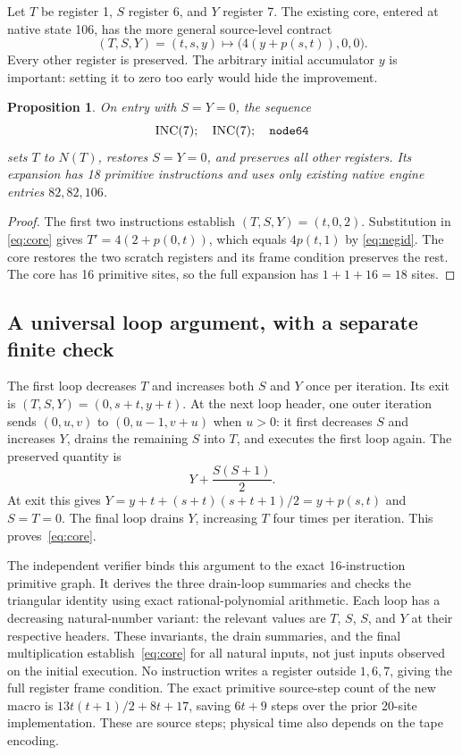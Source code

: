 \documentclass[11pt,a4paper]{article}
\newcommand{\code}[1]{\texttt{\detokenize{#1}}}
\newtheorem{proposition}{Proposition}
\begin{document}
Let $T$ be register 1, $S$ register 6, and $Y$ register 7. The existing
\code{node64} core, entered at native state 106, has the more general
source-level contract
\begin{equation}\label{eq:core}
 (T,S,Y)=(t,s,y)
 \longmapsto
 \bigl(4(y+p(s,t)),0,0\bigr).
\end{equation}
Every other register is preserved. The arbitrary initial accumulator
$y$ is important: setting it to zero too early would hide the improvement.

\begin{proposition}
On entry with $S=Y=0$, the sequence
\[
 \operatorname{INC}(7);\quad\operatorname{INC}(7);\quad\code{node64}
\]
sets $T$ to $N(T)$, restores $S=Y=0$, and preserves all other registers.
Its expansion has 18 primitive instructions and uses only existing native
engine entries $82,82,106$.
\end{proposition}
\begin{proof}
The first two instructions establish $(T,S,Y)=(t,0,2)$. Substitution in
\eqref{eq:core} gives $T'=4(2+p(0,t))$, which equals $4p(t,1)$ by
\eqref{eq:negid}. The core restores the two scratch registers and its
frame condition preserves the rest. The core has 16 primitive sites, so
the full expansion has $1+1+16=18$ sites.
\end{proof}

\subsection{A universal loop argument, with a separate finite check}

The first loop decreases $T$ and increases both $S$ and $Y$ once per
iteration. Its exit is $(T,S,Y)=(0,s+t,y+t)$. At the next loop header,
one outer iteration sends $(0,u,v)$ to $(0,u-1,v+u)$ when $u>0$:
it first decreases $S$ and increases $Y$, drains the remaining $S$ into
$T$, and executes the first loop again. The preserved quantity is
\[
 Y+\frac{S(S+1)}2.
\]
At exit this gives $Y=y+t+(s+t)(s+t+1)/2=y+p(s,t)$ and $S=T=0$.
The final loop drains $Y$, increasing $T$ four times per iteration.
This proves~\eqref{eq:core}.

The independent verifier binds this argument to the exact 16-instruction
primitive graph. It derives the three drain-loop summaries and checks
the triangular identity using exact rational-polynomial arithmetic.
Each loop has a decreasing natural-number variant: the relevant values
are $T$, $S$, $S$, and $Y$ at their respective headers. These invariants,
the drain summaries, and the final multiplication establish~\eqref{eq:core}
for all natural inputs, not just inputs observed on the initial execution.
No instruction writes a register outside $1,6,7$, giving the full register
frame condition. The exact primitive source-step count of the new macro is
$13t(t+1)/2+8t+17$, saving $6t+9$ steps over the prior 20-site implementation.
These are source steps; physical time also depends on the tape encoding.
\end{document}
